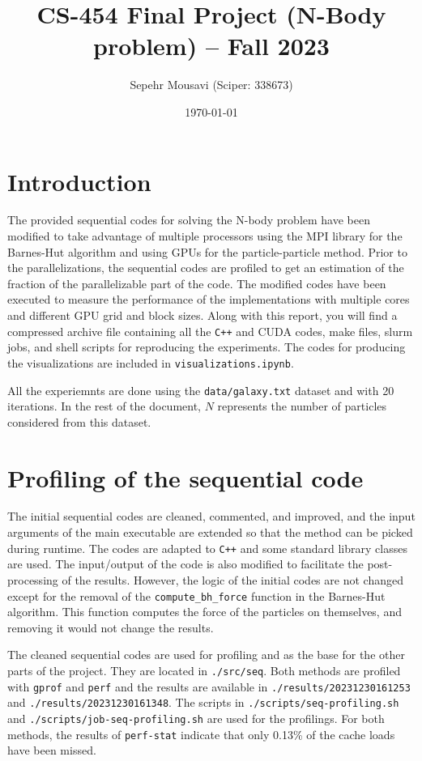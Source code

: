 \documentclass[10pt,journal,compsocconf]{IEEEtran}
\title{CS-454 Final Project (N-Body problem) -- Fall 2023}
\author{
  Sepehr Mousavi (Sciper: 338673)
}
\date{\today}
\newcommand{\code}[1]{\texttt{#1}}
\begin{document}
\maketitle

\section{Introduction}

The provided sequential codes for solving the N-body problem have been modified to take advantage of multiple processors using the MPI library for the Barnes-Hut algorithm and using GPUs for the particle-particle method. Prior to the parallelizations, the sequential codes are profiled to get an estimation of the fraction of the parallelizable part of the code. The modified codes have been executed to measure the performance of the implementations with multiple cores and different GPU grid and block sizes. Along with this report, you will find a compressed archive file containing all the \texttt{C++} and CUDA codes, make files, slurm jobs, and shell scripts for reproducing the experiments. The codes for producing the visualizations are included in \code{visualizations.ipynb}.

All the experiemnts are done using the \texttt{data/galaxy.txt} dataset and with 20 iterations. In the rest of the document, $N$ represents the number of particles considered from this dataset.

\section{Profiling of the sequential code}

The initial sequential codes are cleaned, commented, and improved, and the input arguments of the main executable are extended so that the method can be picked during runtime. The codes are adapted to \texttt{C++} and some standard library classes are used. The input/output of the code is also modified to facilitate the post-processing of the results. However, the logic of the initial codes are not changed except for the removal of the \texttt{compute\_bh\_force} function in the Barnes-Hut algorithm. This function computes the force of the particles on themselves, and removing it would not change the results.

The cleaned sequential codes are used for profiling and as the base for the other parts of the project. They are located in \texttt{./src/seq}. Both methods are profiled with \texttt{gprof} and \texttt{perf} and the results are available in \texttt{./results/20231230161253} and \texttt{./results/20231230161348}. The scripts in \texttt{./scripts/seq-profiling.sh} and \texttt{./scripts/job-seq-profiling.sh} are used for the profilings. For both methods, the results of \texttt{perf-stat} indicate that only 0.13\% of the cache loads have been missed.
\end{document}
